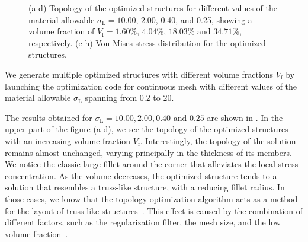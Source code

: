 \begin{figure}
    \hfill
    \hfill
    \hfill
    \caption{(a-d) Topology of the optimized structures for different values of the material allowable $\sigma_\text{L}=10.00$, 2.00, 0.40, and 0.25, showing a volume fraction of $V_\text{f}=1.60\%$, $4.04\%$, $18.03\%$ and $34.71\%$, respectively. (e-h) Von Mises stress distribution for the optimized structures.}
    \label{fig:03_to_sol}
\end{figure}
We generate multiple optimized structures with different volume fractions $V_\text{f}$ by launching the optimization code for continuous mesh with different values of the material allowable $\sigma_\text{L}$ spanning from $0.2$ to $20$.

The results obtained for $\sigma_\text{L}=10.00,2.00,0.40\text{ and }0.25$ are shown in . In the upper part of the figure (a-d), we see the topology of the optimized structures with an increasing volume fraction $V_\text{f}$. Interestingly, the topology of the solution remains almost unchanged, varying principally in the thickness of its members. We notice the classic large fillet around the corner that alleviates the local stress concentration. As the volume decreases, the optimized structure tends to a solution that resembles a truss-like structure, with a reducing fillet radius. In those cases, we know that the topology optimization algorithm acts as a method for the layout of truss-like structures~. This effect is caused by the combination of different factors, such as the regularization filter, the mesh size, and the low volume fraction~. 

